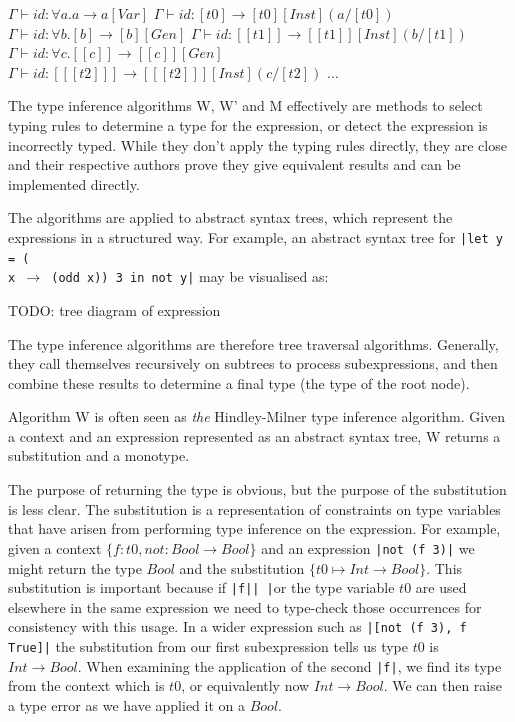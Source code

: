 \documentclass[a4paper,fleqn,twoside,12pt]{report}
\begin{document}
$\Gamma \vdash id : \forall a. a \rightarrow a [Var]$
$\Gamma \vdash id : [t0] \rightarrow [t0] [Inst] (a/[t0])$
$\Gamma \vdash id : \forall b. [b] \rightarrow [b] [Gen]$
$\Gamma \vdash id : [[t1]] \rightarrow [[t1]] [Inst] (b/[t1])$
$\Gamma \vdash id : \forall c. [[c]] \rightarrow [[c]] [Gen]$
$\Gamma \vdash id : [[[t2]]] \rightarrow [[[t2]]] [Inst] (c/[t2])$
$\dots$

The type inference algorithms W, W’ and M effectively are methods to select typing rules to determine a type for the expression, or detect the expression is incorrectly typed. While they don’t apply the typing rules directly, they are close and their respective authors prove they give equivalent results and can be implemented directly.

The algorithms are applied to abstract syntax trees, which represent the expressions in a structured way. For example, an abstract syntax tree for \texttt{|let y = (\\x $\rightarrow$ (odd x)) 3 in not y|} may be visualised as:

TODO: tree diagram of expression

The type inference algorithms are therefore tree traversal algorithms. Generally, they call themselves recursively on subtrees to process subexpressions, and then combine these results to determine a final type (the type of the root node).

Algorithm W is often seen as \textit{the} Hindley-Milner type inference algorithm. Given a context and an expression represented as an abstract syntax tree, W returns a substitution and a monotype.

The purpose of returning the type is obvious, but the purpose of the substitution is less clear. The substitution is a representation of constraints on type variables that have arisen from performing type inference on the expression. For example, given a context $\{ f: t0, not: Bool \rightarrow Bool \}$ and an expression \texttt{|not (f 3)|} we might return the type $Bool$ and the substitution $\{ t0 \mapsto Int \rightarrow Bool \}$. This substitution is important because if \texttt{|f|}\texttt{| |}or the type variable $t0$ are used elsewhere in the same expression we need to type-check those occurrences for consistency with this usage. In a wider expression such as \texttt{|[not (f 3), f True]|} the substitution from our first subexpression tells us type $t0$ is $Int \rightarrow Bool$. When examining the application of the second \texttt{|f|}, we find its type from the context which is $t0$, or equivalently now $Int \rightarrow Bool$. We can then raise a type error as we have applied it on a $Bool$.
\end{document}
